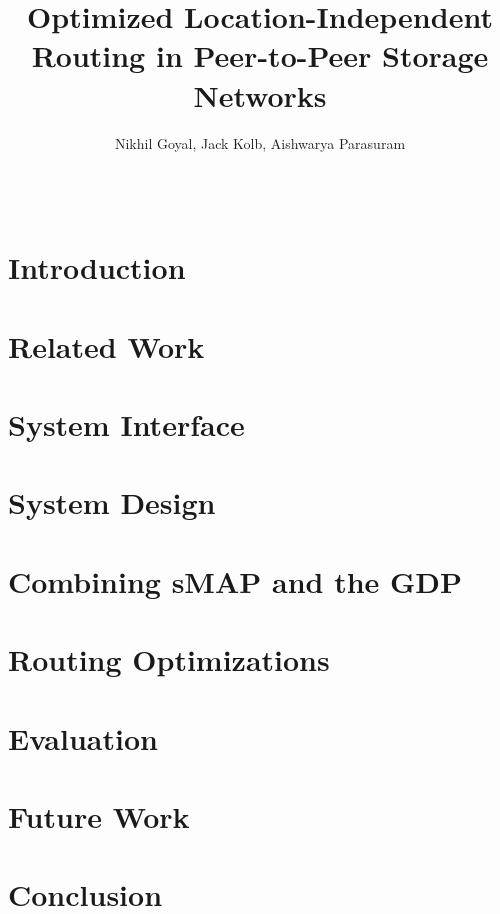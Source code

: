 \documentclass{acm_proc_article-sp}
\begin{document}
\fontsize{10pt}{12pt}\selectfont

\title{Optimized Location-Independent Routing in Peer-to-Peer Storage Networks}
\author{
\alignauthor Nikhil Goyal, Jack Kolb, Aishwarya Parasuram\\
\\
\\
}
\maketitle
\begin{abstract}

\end{abstract}

\section{Introduction}


\section{Related Work}


\section{System Interface}


\section{System Design}


\section{Combining sMAP and the GDP}


\section{Routing Optimizations}


\section{Evaluation}


\section{Future Work}


\section{Conclusion}



\nocite{*}

\end{document}
